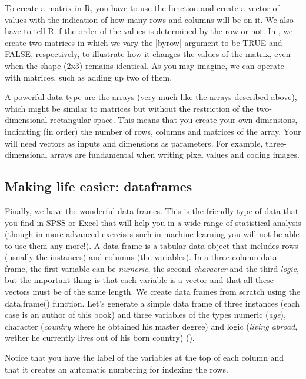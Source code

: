 To create a matrix in R, you have to use the function  and
create a vector of values with the indication of how many rows and
columns will be on it. We also have to tell R if the order of the
values is determined by the row or not. In , we create
two matrices in which we vary the |byrow| argument to be TRUE and
FALSE, respectively, to illustrate how it changes the values of the
matrix, even when the shape (2x3) remains identical. As you may
imagine, we can operate with matrices, such as adding up two of them.

A powerful data type are the arrays (very much like the 
arrays described above), which might be similar to matrices but
without the restriction of the two-dimensional rectangular space. This
means that you create your own dimensions, indicating (in order) the
number of rows, columns and matrices of the array. Your will need
vectors as inputs and dimensions as parameters. For example,
three-dimensional arrays are fundamental when writing pixel values and
coding images. 


\subsection{Making life easier: dataframes}

Finally, we have the wonderful data frames. This is the friendly type
of data that you find in SPSS or Excel that will help you in a wide
range of statistical analysis (though in more advanced exercises such
in machine learning you will not be able to use them any more!).  A
data frame is a tabular data object that includes rows (usually the
instances) and columns (the variables). In a three-column data frame,
the first variable can be \emph{numeric}, the second \emph{character}
and the third \emph{logic}, but the important thing is that each
variable is a vector and that all these vectors must be of the same
length. We create data frames from scratch using the data.frame()
function.  Let’s generate a simple data frame of three instances (each
case is an author of this book) and three variables of the types
numeric (\emph{age}), character (\emph{country} where he obtained his
master degree) and logic (\emph{living abroad}, wether he currently
lives out of his born country) ().


Notice that you have the label of the variables at the top of each column and that it creates an automatic numbering for indexing the rows.  


